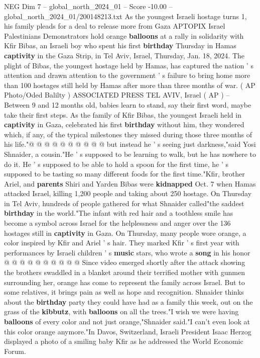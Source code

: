 \begin{textsample}{NEG Dim 7 – global\_north\_2024\_01 – Score -10.00 – global\_north\_2024\_01/200148213.txt}  \label{ex:f7_neg_201}
As the youngest Israeli hostage turns 1, his family pleads for a deal to release more from Gaza APTOPIX Israel Palestinians Demonstrators hold orange \textbf{balloons} at a rally in solidarity with Kfir Bibas, an Israeli boy who spent his first \textbf{birthday} Thursday in Hamas \textbf{captivity} in the Gaza Strip, in Tel Aviv, Israel, Thursday, Jan. 18, 2024.
The plight of Bibas, the youngest hostage held by Hamas, has captured the nation ' s attention and drawn attention to the government ' s failure to bring home more than 100 hostages still held by Hamas after more than three months of war. ( AP Photo/Oded Balilty ) ASSOCIATED PRESS TEL AVIV, Israel ( AP ) -- Between 9 and 12 months old, babies learn to stand, say their first word, maybe take their first steps.
As the family of Kfir Bibas, the youngest Israeli held in \textbf{captivity} in Gaza, celebrated his first \textbf{birthday} without him, they wondered which, if any, of the typical milestones they missed during those three months of his life."@ @ @ @ @ @ @ @ @ @ but instead he ' s seeing just darkness,"said Yosi Shnaider, a cousin."He ' s supposed to be learning to walk, but he has nowhere to do it.
He ' s supposed to be able to hold a spoon for the first time, he ' s supposed to be tasting so many different foods for the first time."Kfir, brother Ariel, and \textbf{parents} Shiri and Yarden Bibas were \textbf{kidnapped} Oct. 7 when Hamas attacked Israel, killing 1,200 people and taking about 250 hostage.
On Thursday in Tel Aviv, hundreds of people gathered for what Shnaider called"the saddest \textbf{birthday} in the world."The infant with red hair and a toothless smile has become a symbol across Israel for the helplessness and anger over the 136 hostages still in \textbf{captivity} in Gaza.
On Thursday, many people wore orange, a color inspired by Kfir and Ariel ' s hair.
They marked Kfir ' s first year with performances by Israeli children ' s \textbf{music} stars, who wrote a \textbf{song} in his honor @ @ @ @ @ @ @ @ @ @ Since video emerged shortly after the attack showing the brothers swaddled in a blanket around their terrified mother with gunmen surrounding her, orange has come to represent the family across Israel.
But to some relatives, it brings pain as well as hope and recognition.
Shnaider thinks about the \textbf{birthday} party they could have had as a family this week, out on the grass of the \textbf{kibbutz}, with \textbf{balloons} on all the trees."I wish we were having \textbf{balloons} of every color and not just orange,"Shnaider said."I can't even look at this color orange anymore."In Davos, Switzerland, Israeli President Isaac Herzog displayed a photo of a smiling baby Kfir as he addressed the World Economic Forum.

\end{textsample}
